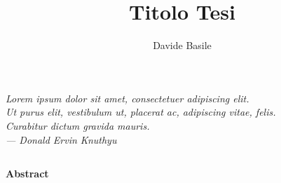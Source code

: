 \documentclass[a4paper,12pt,oneside]{book}
\title{Titolo Tesi}
\author{Davide Basile}
\theoremstyle{definition}
\theoremstyle{definition}
\newcommand\blankpage{%
	\clearpage
	\thispagestyle{plain}
	\null
	\newpage}
\begin{document}
	

	\thispagestyle{plain}
	
	\frontmatter
	\blankpage
	

	\thispagestyle{plain}
	\null\vspace{\stretch{1}}
	\begin{flushright}
			\slshape
			Lorem ipsum dolor sit amet, consectetuer adipiscing elit. \\
			Ut purus elit, vestibulum ut, placerat ac, adipiscing vitae, felis. \\
			Curabitur dictum gravida mauris. \\ \medskip
		--- Donald Ervin Knuthyu
	\end{flushright}
	
	\null
	\blankpage
	
	
	
	\newpage
	

	\thispagestyle{plain}
	\begin{center}
		\chapter*{}
		{\Huge \textbf{Abstract}}\\
		\vspace{15mm}
		\lipsum[1]
	\end{center}
	\blankpage	
	

	\tableofcontents
	\listoftables
	\listoffigures	
	
\end{document}
